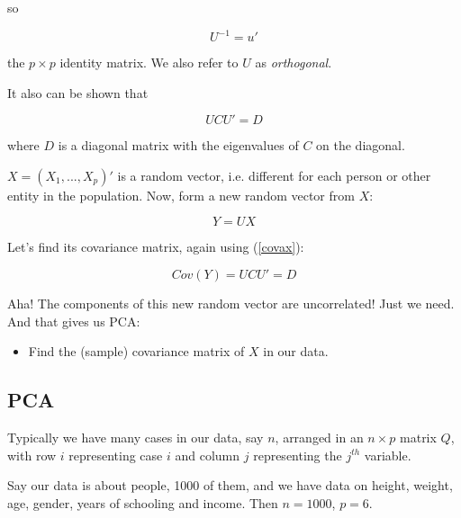 so

\begin{equation}
U^{-1} = u'
\end{equation}

the $p \times p$ identity matrix.  We also refer to $U$ as
\emph{orthogonal}.

It also can be shown that 

\begin{equation}
U C U' = D
\end{equation}

where $D$ is a diagonal matrix with the eigenvalues of $C$ on the
diagonal.

% 


$X = (X_1,...,X_p)'$ is a random vector, i.e. different for each person
or other entity in the population.  Now, form a new random vector from
$X$:

\begin{equation}
Y = UX
\end{equation}

Let's find its covariance matrix, again using (\ref{covax}):

\begin{equation}
Cov(Y) = U C U' = D
\end{equation}

Aha!  The components of this new random vector are uncorrelated!  Just
we need.  And that gives us PCA:

\begin{itemize}

\item Find the (sample) covariance matrix of $X$ in our data.

\end{itemize} 

\subsection{PCA}

Typically we have many cases in our data, say $n$, arranged in an $n
\times p$ matrix $Q$, with row $i$ representing case $i$ and column $j$
representing the $j^{th}$ variable.

Say our data is about people, 1000 of them, and we have data on height,
weight, age, gender, years of schooling and income.  Then $n = 1000$, $p
= 6$.

